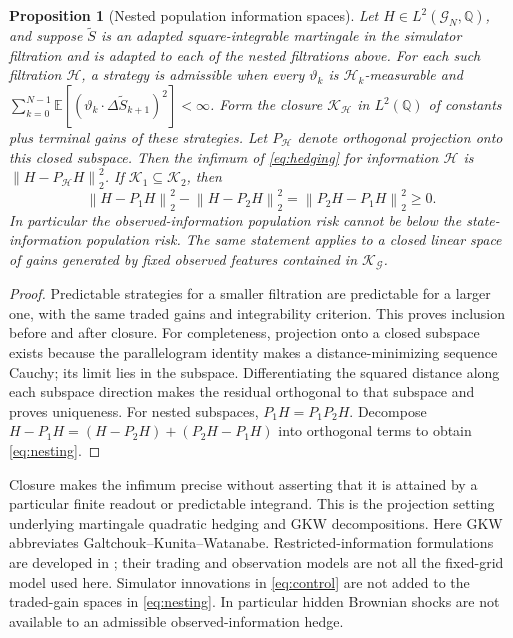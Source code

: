 \documentclass[11pt,a4paper]{article}
\numberwithin{equation}{section}
\newtheorem{proposition}[theorem]{Proposition}
\theoremstyle{definition}
\theoremstyle{remark}
\newcommand{\E}{\mathbb E}
\newcommand{\norm}[1]{\left\lVert #1\right\rVert}
\begin{document}
\begin{proposition}[Nested population information spaces]\label{prop:hedging}
Let $H\in L^2(\mathcal G_N,\mathbb Q)$, and suppose $\widetilde S$ is an
adapted square-integrable martingale in the simulator filtration and is
adapted to each of the nested filtrations above. For each such filtration
$\mathcal H$, a strategy is admissible when every $\vartheta_k$ is
$\mathcal H_k$-measurable and
$\sum_{k=0}^{N-1}\E[(\vartheta_k\cdot\Delta\widetilde S_{k+1})^2]<\infty$.
Form the closure $\mathcal K_{\mathcal H}$ in $L^2(\mathbb Q)$ of
constants plus terminal gains of these strategies. Let
$P_{\mathcal H}$ denote orthogonal projection onto this closed subspace.
Then the infimum of \eqref{eq:hedging} for information $\mathcal H$ is
$\norm{H-P_{\mathcal H}H}_2^2$. If
$\mathcal K_1\subseteq\mathcal K_2$, then
\begin{equation}\label{eq:nesting}
 \norm{H-P_1H}_2^2-\norm{H-P_2H}_2^2
 =\norm{P_2H-P_1H}_2^2\geq0.
\end{equation}
In particular the observed-information population risk cannot be below the
state-information population risk. The same statement applies to a closed
linear space of gains generated by fixed observed features contained in
$\mathcal K_{\mathcal G}$.
\end{proposition}
\begin{proof}
Predictable strategies for a smaller filtration are predictable for a larger
one, with the same traded gains and integrability criterion. This proves
inclusion before and after closure. For completeness, projection onto a
closed subspace exists because the parallelogram identity makes a
distance-minimizing sequence Cauchy; its limit lies in the subspace.
Differentiating the squared distance along each subspace direction makes
the residual orthogonal to that subspace and proves uniqueness. For nested
subspaces, $P_1H=P_1P_2H$. Decompose
$H-P_1H=(H-P_2H)+(P_2H-P_1H)$ into orthogonal terms to obtain
\eqref{eq:nesting}.
\end{proof}
Closure makes the infimum precise without asserting that it is attained by
a particular finite readout or predictable integrand. This is the projection
setting underlying martingale quadratic hedging and GKW decompositions.
Here GKW abbreviates Galtchouk--Kunita--Watanabe.
Restricted-information formulations are developed in
\cite{Schweizer,Mania,FreyRunggaldier}; their trading and observation models
are not all the fixed-grid model used here. Simulator innovations in
\eqref{eq:control} are not added to the traded-gain spaces in
\eqref{eq:nesting}. In particular hidden Brownian shocks are not available
to an admissible observed-information hedge.
\end{document}
